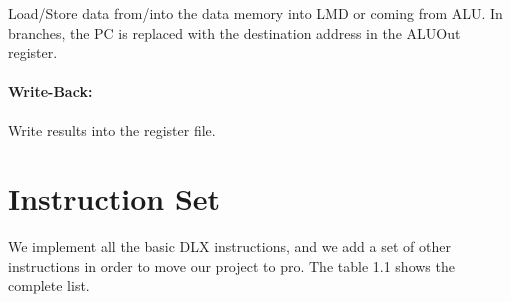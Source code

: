 Load/Store data from/into the data memory into LMD or coming from ALU. In branches, the PC is replaced with the destination
address in the ALUOut register.  

\paragraph{Write-Back:}
	
Write results into the register file.


\section{Instruction Set}

We implement all the basic DLX instructions, and we add a set of other instructions in order to move our project to pro. The table
1.1 shows the complete list.						 
        
